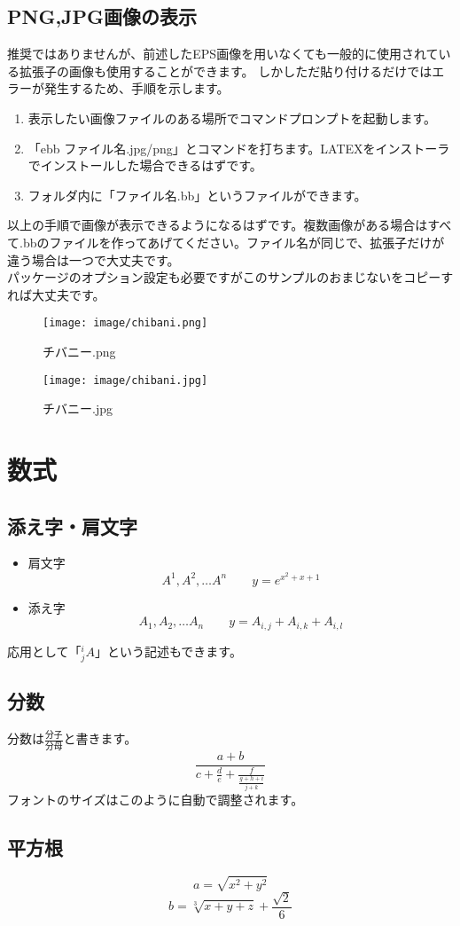 \documentclass{jsarticle}					%
\begin{document}
\subsection{PNG,JPG画像の表示}
	推奨ではありませんが、前述したEPS画像を用いなくても一般的に使用されている拡張子の画像も使用することができます。
	しかしただ貼り付けるだけではエラーが発生するため、手順を示します。
	\begin{enumerate}
		\item 表示したい画像ファイルのある場所でコマンドプロンプトを起動します。
		\item 「ebb ファイル名.jpg/png」とコマンドを打ちます。LATEXをインストーラでインストールした場合できるはずです。
		\item フォルダ内に「ファイル名.bb」というファイルができます。
	\end{enumerate}
	以上の手順で画像が表示できるようになるはずです。複数画像がある場合はすべて.bbのファイルを作ってあげてください。ファイル名が同じで、拡張子だけが違う場合は一つで大丈夫です。\\
	パッケージのオプション設定も必要ですがこのサンプルのおまじないをコピーすれば大丈夫です。
	
	\begin{figure}[h]
	\begin{minipage}[b]{.22\linewidth}
		\texttt{[image: image/chibani.png]}
		\caption{チバニー.png}
	\end{minipage}
	\hspace{5mm}
	\begin{minipage}[b]{.22\linewidth}
		\texttt{[image: image/chibani.jpg]}
		\caption{チバニー.jpg}
	\end{minipage}
	\end{figure}

\pagebreak

\section{数式}
\subsection{添え字・肩文字}
	\begin{itemize}
		\item 肩文字
	\[											%
	A^1,A^2,\dots A^n \qquad y = e^{x^2+x+1}			%
	\]											%
		\item 添え字
	\[
	A_1,A_2,\dots A_n \qquad y = A_{i,j} + A_{i,k} + A_{i,l}	%
	\]
	\end{itemize}
	応用として「${}^i_jA$」という記述もできます。
	
\subsection{分数}
	分数は$\frac{分子}{分母}$と書きます。
	\[
	\frac{a+b}{c+\frac{d}{e}+\frac{f}{\frac{g+h+i}{j+k}}}
	\]
	フォントのサイズはこのように自動で調整されます。
	
\subsection{平方根}
	\[
	a = \sqrt{x^2+y^2}
	\]
	\[
	b = \sqrt[3]{x+y+z} + \frac{\sqrt{2}}{6}
	\]
	
\end{document}
